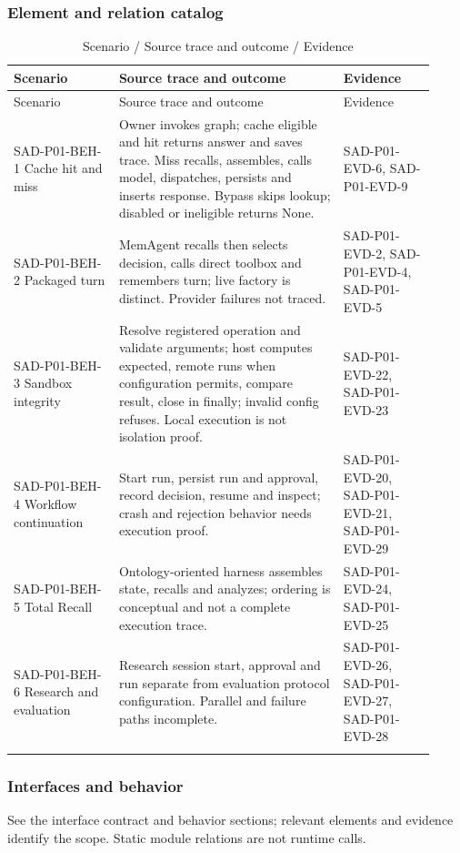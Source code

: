 \documentclass[10pt,letterpaper]{article}
\begin{document}
\subsubsection{Element and relation catalog}
\begin{longtable}{@{}>{\raggedright\arraybackslash}p{0.23\linewidth}>{\raggedright\arraybackslash}p{0.49\linewidth}>{\raggedright\arraybackslash}p{0.2\linewidth}@{}}
\caption{Scenario / Source trace and outcome / Evidence}\\
\toprule Scenario & Source trace and outcome & Evidence\\\midrule\endfirsthead
\toprule Scenario & Source trace and outcome & Evidence\\\midrule\endhead
SAD-P01-BEH-1 Cache hit and miss & Owner invokes graph; cache eligible and hit returns answer and saves trace. Miss recalls, assembles, calls model, dispatches, persists and inserts response. Bypass skips lookup; disabled or ineligible returns None. & SAD-P01-EVD-6, SAD-P01-EVD-9\\\addlinespace
SAD-P01-BEH-2 Packaged turn & MemAgent recalls then selects decision, calls direct toolbox and remembers turn; live factory is distinct. Provider failures not traced. & SAD-P01-EVD-2, SAD-P01-EVD-4, SAD-P01-EVD-5\\\addlinespace
SAD-P01-BEH-3 Sandbox integrity & Resolve registered operation and validate arguments; host computes expected, remote runs when configuration permits, compare result, close in finally; invalid config refuses. Local execution is not isolation proof. & SAD-P01-EVD-22, SAD-P01-EVD-23\\\addlinespace
SAD-P01-BEH-4 Workflow continuation & Start run, persist run and approval, record decision, resume and inspect; crash and rejection behavior needs execution proof. & SAD-P01-EVD-20, SAD-P01-EVD-21, SAD-P01-EVD-29\\\addlinespace
SAD-P01-BEH-5 Total Recall & Ontology-oriented harness assembles state, recalls and analyzes; ordering is conceptual and not a complete execution trace. & SAD-P01-EVD-24, SAD-P01-EVD-25\\\addlinespace
SAD-P01-BEH-6 Research and evaluation & Research session start, approval and run separate from evaluation protocol configuration. Parallel and failure paths incomplete. & SAD-P01-EVD-26, SAD-P01-EVD-27, SAD-P01-EVD-28\\\addlinespace
\bottomrule\end{longtable}

\subsubsection{Interfaces and behavior}
See the interface contract and behavior sections; relevant elements and evidence identify the scope. Static module relations are not runtime calls.
\end{document}
